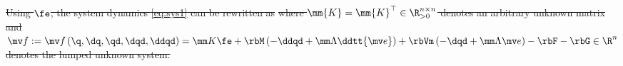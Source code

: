 \documentclass[letterpaper, journal]{IEEEtran}
\providecommand{\DIFdel}[1]{{\protect\color{red}\sout{#1}}} %
\providecommand{\DIFdelbegin}{} %
\providecommand{\DIFdelend}{} %
\begin{document}

\DIFdelbegin \DIFdel{Using $\fe$, the system dynamics \eqref{eq:sys1} can be rewritten as
}%
\DIFdel{where $\mm{K}=\mm{K}^\top\in\R^{n\times n}_{>0}$ denotes an arbitrary unknown matrix and $
    \mv f:= \mv f
    \left(
        \q,\dq,\qd,\dqd,\ddqd
    \right)
    =
    \mm K \fe
    +\rbM
    \left(
        -\ddqd+\mm\Lambda\ddtt{\mv e}
    \right)
    +
    \rbVm
    \left(
        -\dqd+\mm\Lambda\mv e
    \right)
    -
    \rbF
    -
    \rbG
    \in\R^n
$ denotes the lumped unknown system.
}\DIFdelend %
\end{document}
